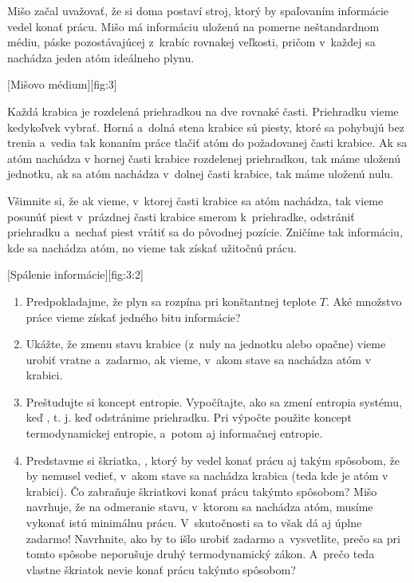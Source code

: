 Mišo začal uvažovať, že si doma postaví stroj, ktorý by spaľovaním informácie vedel konať prácu.
Mišo má informáciu uloženú na pomerne neštandardnom médiu, páske pozostávajúcej z~krabíc rovnakej veľkosti,
pričom v~každej sa nachádza jeden atóm ideálneho plynu.

[Mišovo médium][fig:3]

Každá krabica je rozdelená priehradkou na dve rovnaké časti. Priehradku vieme kedykoľvek vybrať.
Horná a~dolná stena krabice sú piesty, ktoré sa pohybujú bez trenia a~vedia tak konaním práce tlačiť
atóm do požadovanej časti krabice. Ak sa atóm nachádza v hornej časti krabice rozdelenej priehradkou,
tak máme uloženú jednotku, ak sa atóm nachádza v~dolnej časti krabice, tak máme uloženú nulu. 
 
Všimnite si, že ak vieme, v~ktorej časti krabice sa atóm nachádza, tak vieme posunúť piest v~prázdnej
časti krabice smerom k~priehradke, odstrániť priehradku a~nechať piest vrátiť sa do pôvodnej pozície.
Zničíme tak informáciu, kde sa nachádza atóm, no vieme tak získať užitočnú prácu.

[Spálenie informácie][fig:3:2]

\begin{enumerate}
	\item Predpokladajme, že plyn sa rozpína pri konštantnej teplote $T$.
		Aké množstvo práce vieme získať  jedného bitu informácie?
	\item Ukážte, že zmenu stavu krabice (z~nuly na jednotku alebo opačne) vieme urobiť vratne a~zadarmo,
		ak vieme, v~akom stave sa nachádza atóm v krabici.
	\item Preštudujte si koncept entropie. Vypočítajte, ako sa zmení entropia systému,
		keď , t. j. keď odstránime priehradku. Pri výpočte použite koncept
		termodynamickej entropie, a~potom aj informačnej entropie.
	\item Predstavme si škriatka, , ktorý by vedel konať prácu aj takým spôsobom,
		že by nemusel vedieť, v~akom stave sa nachádza krabica (teda kde je atóm v krabici).
		Čo zabraňuje škriatkovi konať prácu takýmto spôsobom? Mišo navrhuje, že na odmeranie stavu,
		v~ktorom sa nachádza atóm, musíme vykonať istú minimálnu prácu. V~skutočnosti sa to však dá aj úplne zadarmo!
		Navrhnite, ako by to išlo urobiť zadarmo a~vysvetlite, prečo sa pri tomto spôsobe neporušuje druhý
		termodynamický zákon. A~prečo teda vlastne škriatok nevie konať prácu takýmto spôsobom?
\end{enumerate}
